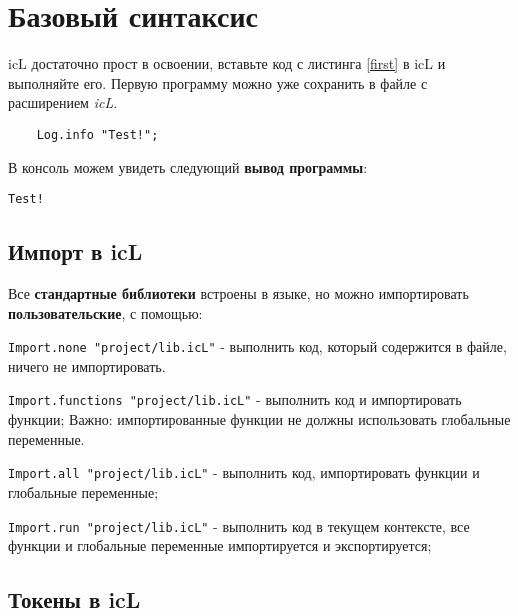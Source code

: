 

\section{Базовый синтаксис}

icL достаточно прост в освоении, вставьте код с листинга \ref{first} в icL и выполняйте его. Первую программу можно уже сохранить в файле с расширением \textit{icL}.

\begin{sourcecode}
	\label{first}
	\begin{verbatim}
	Log.info "Test!";
	\end{verbatim}
\end{sourcecode}

В консоль можем увидеть следующий \textbf{вывод программы}:

\begin{verbatim}
Test!
\end{verbatim}

\subsection{Импорт в icL}

Все \textbf{стандартные библиотеки} встроены в языке, но можно импортировать \textbf{пользовательские}, с помощью:

\begin{icItems}
\item
	\texttt{Import.none "project/lib.icL"} - выполнить код, который содержится в файле, ничего не импортировать.
\item
	\texttt{Import.functions "project/lib.icL"} - выполнить код и импортировать функции; {\color{red}Важно:} импортированные функции не должны использовать глобальные переменные.
\item
	\texttt{Import.all "project/lib.icL"} -  выполнить код, импортировать функции и глобальные переменные;
\item
	\texttt{Import.run "project/lib.icL"} - выполнить код в текущем контексте, все функции и глобальные переменные импортируется и экспортируется;
\end{icItems}

\subsection{Токены в icL}

